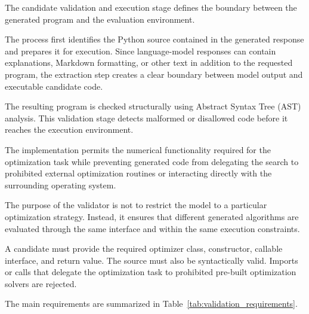 The candidate validation and execution stage defines the boundary between the
generated program and the evaluation environment.

The process first identifies the Python source contained in the generated
response and prepares it for execution. Since language-model responses can
contain explanations, Markdown formatting, or other text in addition to the
requested program, the extraction step creates a clear boundary between model
output and executable candidate code.

The resulting program is checked structurally using Abstract Syntax Tree
(AST) analysis. This validation stage detects malformed or disallowed code
before it reaches the execution environment.

The implementation permits the numerical functionality required for the
optimization task while preventing generated code from delegating the search
to prohibited external optimization routines or interacting directly with the
surrounding operating system.

The purpose of the validator is not to restrict the model to a particular
optimization strategy. Instead, it ensures that different generated algorithms
are evaluated through the same interface and within the same execution
constraints.

A candidate must provide the required optimizer class, constructor, callable
interface, and return value. The source must also be syntactically valid.
Imports or calls that delegate the optimization task to prohibited pre-built
optimization solvers are rejected.

The main requirements are summarized in
Table~\ref{tab:validation_requirements}.

